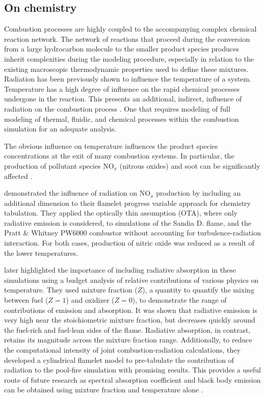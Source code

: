 \subsection{On chemistry}
Combustion processes are highly coupled to the accompanying complex chemical reaction network.
The network of reactions that proceed during the conversion from a large hydrocarbon molecule to the smaller product species produces inherit complexities during the modeling procedure, especially in relation to the existing macroscopic thermodynamic properties used to define these mixtures.
Radiation has been previously shown to influence the temperature of a system. Temperature has a high degree of influence on the rapid chemical processes undergone in the reaction.
This presents an additional, indirect, influence of radiation on the combustion process . One that requires modeling of full modeling of thermal, fluidic, and chemical processes within the combustion simulation for an adequate analysis.

The obvious influence on temperature influences the product species concentrations at the exit of many combustion systems. In particular, the production of pollutant species NO$_x$ (nitrous oxides) and soot can be significantly affected \cite{Viskanta2010RadiativeSystems}.

\citet{Ihme2008ModelingFormulation} demonstrated the influence of radiation on NO$_x$ production by including an additional dimension to their flamelet progress variable approach for chemistry tabulation.
They applied the optically thin assumption (OTA), where only radiative emission is considered, to simulations of the Sandia D. flame, and the Pratt \& Whitney PW6000 combustor without accounting for turbulence-radiation interaction.
For both cases, production of nitric oxide was reduced as a result of the lower temperatures.

\citet{Wu2021LimitationsFires} later highlighted the importance of including radiative absorption in these simulations using a budget analysis of relative contributions of various physics on temperature. 
They used mixture fraction ($Z$), a quantity to quantify the mixing between fuel ($Z=1$) and oxidizer ($Z=0$), to demonstrate the range of contributions of emission and absorption.
It was shown that radiative emission is very high near the stoichiometric mixture fraction, but decreases quickly around the fuel-rich and fuel-lean sides of the flame. Radiative absorption, in contrast, retains its magnitude across the mixture fraction range.
Additionally, to reduce the computational intensity of joint combustion-radiation calculations, they developed a cylindrical flamelet model to pre-tabulate the contribution of radiation to the pool-fire simulation with promising results.
This provides a useful route of future research as spectral absorption coefficient and black body emission can be obtained using mixture fraction and temperature alone \cite{Viskanta2010RadiativeSystems}.

